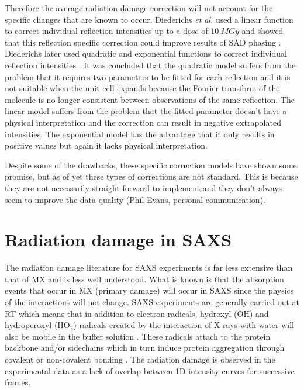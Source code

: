 		Therefore the average radiation damage correction will not account for the specific changes that are known to occur.
		Diederichs \textit{et al.} used a linear function to correct individual reflection intensities up to a dose of $10\ MGy$ and showed that this reflection specific correction could improve results of SAD phasing \cite{diederichs2003}.
		Diederichs later used quadratic and exponential functions to correct individual reflection intensities \cite{diederichs2006}.
		It was concluded that the quadratic model suffers from the problem that it requires two parameters to be fitted for each reflection and it is not suitable when the unit cell expands because the Fourier transform of the molecule is no longer consistent between observations of the same reflection.
		The linear model suffers from the problem that the fitted parameter doesn't have a physical interpretation and the correction can result in negative extrapolated intensities.
		The exponential model has the advantage that it only results in positive values but again it lacks physical interpretation.

		Despite some of the drawbacks, these specific correction models have shown some promise, but as of yet these types of corrections are not standard. This is because they are not necessarily straight forward to implement and they don't always seem to improve the data quality (Phil Evans, personal communication).

\section{Radiation damage in SAXS}
\label{sec:Radiation damage in SAXS}
    The radiation damage literature for SAXS experiments is far less extensive than that of MX and is less well understood.
    What is known is that the absorption events that occur in MX (primary damage) will occur in SAXS since the physics of the interactions will not change.
    SAXS experiments are generally carried out at RT which means that in addition to electron radicals, hydroxyl (OH) and hydroperoxyl (HO$_2$) radicals created by the interaction of X-rays with water will also be mobile in the buffer solution \cite{jeffries2015limiting,garrison1987reaction}.
    These radicals attach to the protein backbone and/or sidechains which in turn induce protein aggregation through covalent or non-covalent bonding \cite{kuwamoto2004radiation}.
    The radiation damage is observed in the experimental data as a lack of overlap between 1D intensity curves for successive frames.

